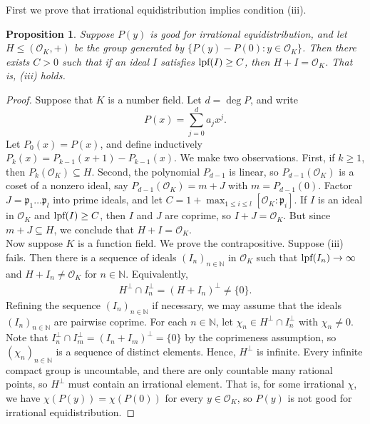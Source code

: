 \documentclass{amsart}
\newtheorem{proposition}[theorem]{Proposition}
\theoremstyle{definition}
\numberwithin{equation}{section}
\newcommand{\N}{\mathbb{N}}
\newcommand{\p}{\mathfrak{p}}
\newcommand{\mO}{\mathcal{O}}
\newcommand{\lpf}{\normalfont\text{lpf}}
\begin{document}
First we prove that irrational equidistribution implies condition (iii).

\begin{proposition} \label{prop: irrational equidistribution}
	Suppose $P(y)$ is good for irrational equidistribution,
	and let $H \le (\mO_K, +)$ be the group generated by $\{P(y) - P(0) : y \in \mO_K\}$.
	Then there exists $C > 0$ such that if an ideal $I$ satisfies $\lpf(I) \ge C$,
	then $H + I = \mO_K$.
	That is, (iii) holds.
\end{proposition}
\begin{proof}
    Suppose that $K$ is a number field.
    Let $d = \deg{P}$, and write
    \begin{equation*}
        P(x) = \sum_{j=0}^d a_j x^j.
    \end{equation*}
    Let $P_0(x) = P(x)$, and define inductively $P_k(x) = P_{k-1}(x+1) - P_{k-1}(x)$.
    We make two observations.
    First, if $k \ge 1$, then $P_k(\mO_K) \subseteq H$.
    Second, the polynomial $P_{d-1}$ is linear, so $P_{d-1}(\mO_K)$ is a coset of a nonzero ideal, say $P_{d-1}(\mO_K) = m+J$ with $m = P_{d-1}(0)$.
    Factor $J = \p_1 \ldots \p_l$ into prime ideals, and let $C = 1 + \max_{1 \le i \le l} [\mO_K : \p_i]$.
    If $I$ is an ideal in $\mO_K$ and $\lpf(I) \ge C$, then $I$ and $J$ are coprime, so $I + J = \mO_K$.
    But since $m+J \subseteq H$, we conclude that $H + I = \mO_K$. \\

    Now suppose $K$ is a function field.
    We prove the contrapositive.
	Suppose (iii) fails.
    Then there is a sequence of ideals $(I_n)_{n \in \N}$ in $\mO_K$ such that $\lpf(I_n) \to \infty$ and $H + I_n \ne \mO_K$ for $n \in \N$.
	Equivalently,
	\begin{align*}
		H^{\perp} \cap I_n^{\perp} = (H + I_n)^{\perp} \ne \{0\}.
	\end{align*}
    Refining the sequence $(I_n)_{n \in \N}$ if necessary, we may assume that the ideals $(I_n)_{n \in \N}$ are pairwise coprime.
    For each $n \in \N$, let $\chi_n \in H^{\perp} \cap I_n^{\perp}$ with $\chi_n \ne 0$.
    Note that $I_n^{\perp} \cap I_m^{\perp} = (I_n + I_m)^{\perp} = \{0\}$ by the coprimeness assumption, so $(\chi_n)_{n \in \N}$ is a sequence of distinct elements.
    Hence, $H^{\perp}$ is infinite.
	Every infinite compact group is uncountable, and there are only countable many rational points, so $H^{\perp}$ must contain an irrational element.
	That is, for some irrational $\chi$, we have $\chi(P(y)) = \chi(P(0))$ for every $y \in \mO_K$, so $P(y)$ is not good for irrational equidistribution.
\end{proof}
\end{document}
